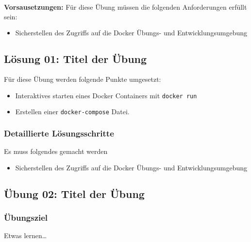\textbf{Vorsausetzungen:} Für diese Übung müssen die folgenden
Anforderungen erfüllt sein:

\begin{itemize}
\tightlist
\item
  Sicherstellen des Zugriffs auf die Docker Übungs- und
  Entwicklungsumgebung
\end{itemize}

\hypertarget{luxf6sung-01-titel-der-uxfcbung}{%
\subsection{Lösung 01: Titel der
Übung}\label{luxf6sung-01-titel-der-uxfcbung}}

Für diese Übung werden folgende Punkte umgesetzt:

\begin{itemize}
\tightlist
\item
  Interaktives starten eines Docker Containers mit
  \passthrough{\lstinline!docker run!}
\item
  Erstellen einer \passthrough{\lstinline!docker-compose!} Datei.
\end{itemize}

\hypertarget{detaillierte-luxf6sungsschritte}{%
\subsubsection{Detaillierte
Lösungsschritte}\label{detaillierte-luxf6sungsschritte}}

Es muss folgendes gemacht werden

\begin{itemize}
\tightlist
\item
  Sicherstellen des Zugriffs auf die Docker Übungs- und
  Entwicklungsumgebung
\end{itemize}

\hypertarget{uxfcbung-02-titel-der-uxfcbung}{%
\subsection{Übung 02: Titel der
Übung}\label{uxfcbung-02-titel-der-uxfcbung}}

\hypertarget{uxfcbungsziel-1}{%
\subsubsection{Übungsziel}\label{uxfcbungsziel-1}}

Etwas lernen\ldots{}

